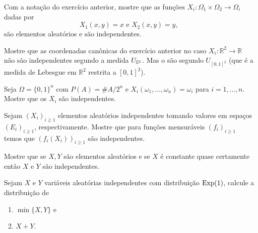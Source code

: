 \begin{exercise}
  Com a notação do exercício anterior, mostre que as funções $X_i:\Omega_1 \times \Omega_2 \to \Omega_i$ dadas por
  \begin{equation}
    X_1(x,y) = x \text{ e } X_2 (x,y) = y,
  \end{equation}
  são elementos aleatórios e são independentes.
\end{exercise}

\begin{exercise}
  Mostre que as coordenadas canônicas do exercício anterior no caso $X_i: \mathbb{R}^2 \to \mathbb{R}$ não são independentes segundo a medida $U_{{\mathbb S}^1}$.
  Mas o são segundo $U_{[0,1]^2}$ (que é a medida de Lebesgue em $\mathbb{R}^2$ restrita a $[0,1]^2$).
\end{exercise}

\begin{exercise}
  Seja $\Omega = \{0,1\}^n$ com $P(A) = \#A/2^n$ e $X_i(\omega_1, \dots, \omega_n) = \omega_i$ para $i = 1, \dots, n$.
  Mostre que os $X_i$ são independentes.
\end{exercise}

\begin{exercise}\label{ex:indepfunc}
  Sejam $(X_i)_{i \geq 1}$ elementos aleatórios independentes tomando valores em espaços $(E_i)_{i \geq 1}$, respectivamente.
  Mostre que para funções mensuráveis $(f_i)_{i \geq 1}$ temos que $(f_i(X_i))_{i \geq 1}$ são independentes.
\end{exercise}




\begin{exercise}
  Mostre que se $X, Y$ são elementos aleatórios e se $X$ é constante quase certamente então $X$ e $Y$ são independentes.
\end{exercise}

\begin{exercise}
  Sejam $X$ e $Y$ variáveis aleatórias independentes com distribuição $\operatorname{Exp}(1)$, calcule a distribuição de
  \begin{enumerate}[\quad a)]
  \item $\min\{X,Y\}$ e
  \item $X + Y$.
  \end{enumerate}
\end{exercise}


